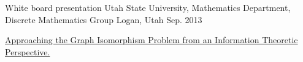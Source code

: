 \begin{cventries}

\cventry
{White board presentation} %
{Utah State University, Mathematics Department, Discrete Mathematics Group} %
{Logan, Utah} %
{Sep. 2013} %
{ %
\begin{cvitems}
\item { \href{https://www.researchgate.net/publication/303565742_Approaching_the_Graph_Isomorphism_Problem_from_an_Information_Theoretic_Perspective}{Approaching the Graph Isomorphism Problem from an Information Theoretic Perspective.}}
\end{cvitems}
}














\end{cventries}